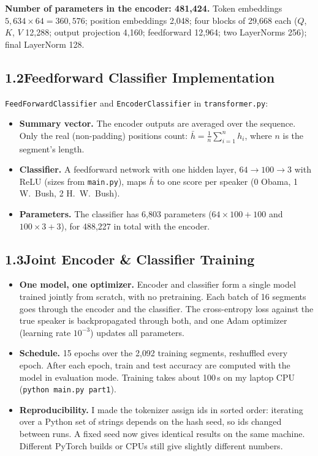 \documentclass[11pt]{article}
\newcommand{\code}[1]{\texttt{#1}}
\begin{document}
\textbf{Number of parameters in the encoder: 481{,}424.} Token embeddings $5{,}634 \times 64 = 360{,}576$; position embeddings 2{,}048; four blocks of 29{,}668 each ($Q$, $K$, $V$ 12{,}288; output projection 4{,}160; feedforward 12{,}964; two LayerNorms 256); final LayerNorm 128.

\subsection*{1.2\quad Feedforward Classifier Implementation}

\code{FeedForwardClassifier} and \code{EncoderClassifier} in \code{transformer.py}:
\begin{itemize}
  \item \textbf{Summary vector.} The encoder outputs are averaged over the sequence. Only the real (non-padding) positions count: $\bar{h} = \frac{1}{n}\sum_{i=1}^{n} h_i$, where $n$ is the segment's length.
  \item \textbf{Classifier.} A feedforward network with one hidden layer, $64 \rightarrow 100 \rightarrow 3$ with ReLU (sizes from \code{main.py}), maps $\bar{h}$ to one score per speaker (0 Obama, 1 W.\ Bush, 2 H.\ W.\ Bush).
  \item \textbf{Parameters.} The classifier has 6{,}803 parameters ($64 \times 100 + 100$ and $100 \times 3 + 3$), for 488{,}227 in total with the encoder.
\end{itemize}

\subsection*{1.3\quad Joint Encoder \& Classifier Training}

\begin{itemize}
  \item \textbf{One model, one optimizer.} Encoder and classifier form a single model trained jointly from scratch, with no pretraining. Each batch of 16 segments goes through the encoder and the classifier. The cross-entropy loss against the true speaker is backpropagated through both, and one Adam optimizer (learning rate $10^{-3}$) updates all parameters.
  \item \textbf{Schedule.} 15 epochs over the 2{,}092 training segments, reshuffled every epoch. After each epoch, train and test accuracy are computed with the model in evaluation mode. Training takes about 100\,s on my laptop CPU (\code{python main.py part1}).
  \item \textbf{Reproducibility.} I made the tokenizer assign ids in sorted order: iterating over a Python set of strings depends on the hash seed, so ids changed between runs. A fixed seed now gives identical results on the same machine. Different PyTorch builds or CPUs still give slightly different numbers.
\end{itemize}
\end{document}
